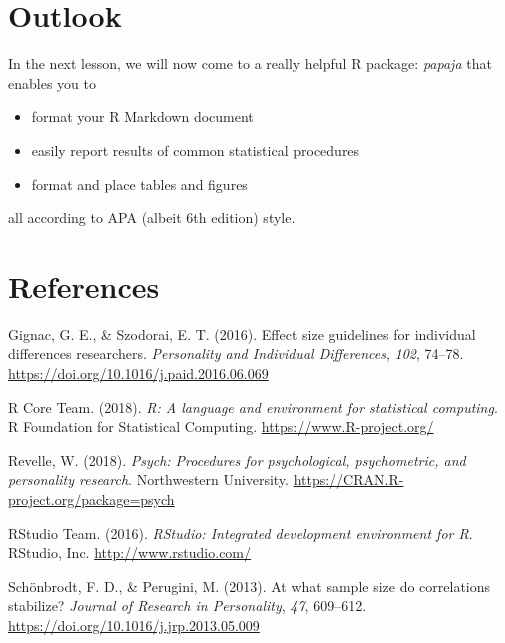 \documentclass[
]{article}
\providecommand{\tightlist}{%
  \setlength{\itemsep}{0pt}\setlength{\parskip}{0pt}}
\newlength{\cslhangindent}
\newlength{\cslentryspacingunit} %
\newenvironment{CSLReferences}[2] %
 {%
  \setlength{\parindent}{0pt}
  \ifodd #1
  \let\oldpar\par
  \def\par{\hangindent=\cslhangindent\oldpar}
  \fi
  \setlength{\parskip}{#2\cslentryspacingunit}
 }%
 {}
\begin{document}
\hypertarget{outlook}{%
\section{Outlook}\label{outlook}}

In the next lesson, we will now come to a really helpful R package:
\emph{papaja} that enables you to

\begin{itemize}
\tightlist
\item
  format your R Markdown document
\item
  easily report results of common statistical procedures
\item
  format and place tables and figures
\end{itemize}

all according to APA (albeit 6th edition) style.

\hypertarget{references}{%
\section*{References}\label{references}}

\hypertarget{refs}{}
\begin{CSLReferences}{1}{0}
\leavevmode{}%
Gignac, G. E., \& Szodorai, E. T. (2016). Effect size guidelines for
individual differences researchers. \emph{Personality and Individual
Differences}, \emph{102}, 74--78.
\url{https://doi.org/10.1016/j.paid.2016.06.069}

\leavevmode{}%
R Core Team. (2018). \emph{R: A language and environment for statistical
computing}. R Foundation for Statistical Computing.
\url{https://www.R-project.org/}

\leavevmode{}%
Revelle, W. (2018). \emph{Psych: Procedures for psychological,
psychometric, and personality research}. Northwestern University.
\url{https://CRAN.R-project.org/package=psych}

\leavevmode{}%
RStudio Team. (2016). \emph{RStudio: Integrated development environment
for {R}}. RStudio, Inc. \url{http://www.rstudio.com/}

\leavevmode{}%
Schönbrodt, F. D., \& Perugini, M. (2013). At what sample size do
correlations stabilize? \emph{Journal of Research in Personality},
\emph{47}, 609--612. \url{https://doi.org/10.1016/j.jrp.2013.05.009}

\end{CSLReferences}
\end{document}

